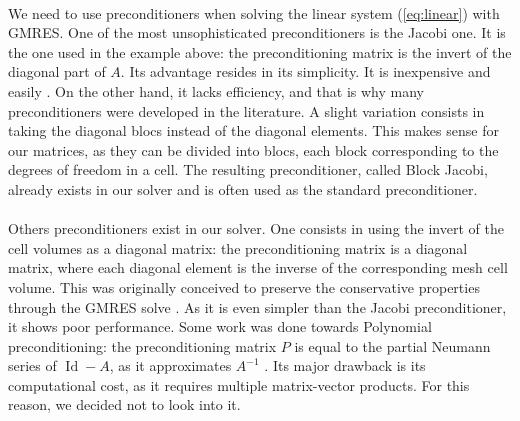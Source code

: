       \paragraph{}
      We need to use preconditioners when solving the linear system (\ref{eq:linear}) with GMRES.
      One of the most unsophisticated preconditioners is the Jacobi one.
      It is the one used in the example above: the preconditioning matrix is the invert of the diagonal part of $A$.
      Its advantage resides in its simplicity.
      It is inexpensive and easily .
      On the other hand, it lacks efficiency, and that is why many preconditioners were developed in the literature.
      A slight variation consists in taking the diagonal blocs instead of the diagonal elements.
      This makes sense for our matrices, as they can be divided into blocs, each block corresponding to the degrees of freedom in a cell.
      The resulting preconditioner, called Block Jacobi, already exists in our solver and is often used as the standard preconditioner.

      \paragraph{}
      Others preconditioners exist in our solver.
      One consists in using the invert of the cell volumes as a diagonal matrix: the preconditioning matrix is a diagonal matrix, where each diagonal element is the inverse of the corresponding mesh cell volume.
      This was originally conceived to preserve the conservative properties through the GMRES solve .
      As it is even simpler than the Jacobi preconditioner, it shows poor performance.
      Some work was done towards Polynomial preconditioning: the preconditioning matrix $P$ is equal to the partial Neumann series of $\operatorname{Id} - A$, as it approximates $A^{-1}$ \cite{DuboisGreenbaumRodrigue1979}.
      Its major drawback is its computational cost, as it requires multiple matrix-vector products.
      For this reason, we decided not to look into it.

